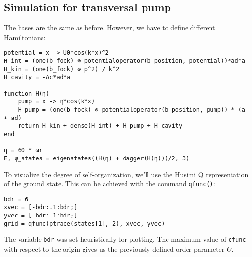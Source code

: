 \subsection{Simulation for transversal pump}

The bases are the same as before. However, we have to define different Hamiltonians:

\begin{lstlisting}
potential = x -> U0*cos(k*x)^2
H_int = (one(b_fock) ⊗ potentialoperator(b_position, potential))*ad*a
H_kin = (one(b_fock) ⊗ p^2) / k^2
H_cavity = -Δc*ad*a

function H(η)
    pump = x -> η*cos(k*x)
    H_pump = (one(b_fock) ⊗ potentialoperator(b_position, pump)) * (a + ad)
    return H_kin + dense(H_int) + H_pump + H_cavity
end

η = 60 * ωr
E, ψ_states = eigenstates((H(η) + dagger(H(η)))/2, 3)
\end{lstlisting} To visualize the degree of self-organization, we'll use the Husimi Q representation of the ground state. This can be achieved with the command \texttt{qfunc()}:

\begin{lstlisting}
bdr = 6
xvec = [-bdr:.1:bdr;]
yvec = [-bdr:.1:bdr;]
grid = qfunc(ptrace(states[1], 2), xvec, yvec)
\end{lstlisting}The variable \texttt{bdr} was set heuristically for plotting. The maximum value of \texttt{qfunc} with respect to the origin gives us the previously defined order parameter $\Theta$.